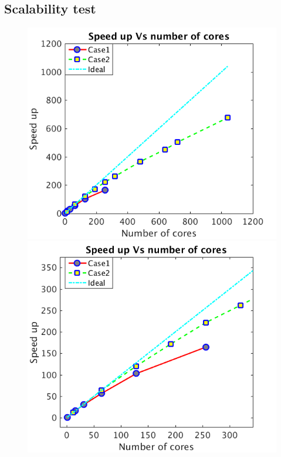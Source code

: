 \subsection{Scalability test}
\begin{figure}[!t]
\centering
\includegraphics[scale=0.31]{Chapter-5/Figures/strong_scale}
\hfil
\includegraphics[scale=0.31]{Chapter-5/Figures/strong_scale_zoom}
\hfil

\end{figure}
